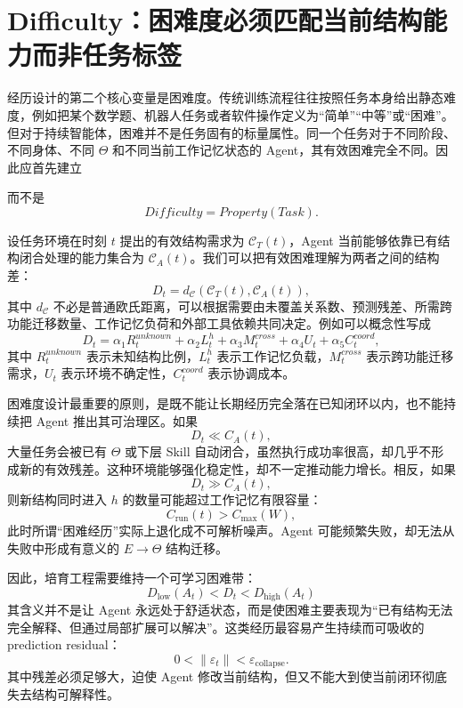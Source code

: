 \section{Difficulty：困难度必须匹配当前结构能力而非任务标签}

经历设计的第二个核心变量是困难度。传统训练流程往往按照任务本身给出静态难度，例如把某个数学题、机器人任务或者软件操作定义为“简单”“中等”或“困难”。但对于持续智能体，困难并不是任务固有的标量属性。同一个任务对于不同阶段、不同身体、不同 $\Theta$ 和不同当前工作记忆状态的 Agent，其有效困难完全不同。因此应首先建立
\begin{statementbox}
\centering
{}
\end{statementbox}
而不是
\[
Difficulty=Property(Task).
\]

设任务环境在时刻 $t$ 提出的有效结构需求为 $\mathcal C_T(t)$，Agent 当前能够依靠已有结构闭合处理的能力集合为 $\mathcal C_A(t)$。我们可以把有效困难理解为两者之间的结构差：
\[
D_t
=
d_{\mathcal C}
\left(
\mathcal C_T(t),
\mathcal C_A(t)
\right),
\]
其中 $d_{\mathcal C}$ 不必是普通欧氏距离，可以根据需要由未覆盖关系数、预测残差、所需跨功能迁移数量、工作记忆负荷和外部工具依赖共同决定。例如可以概念性写成
\[
D_t
=
\alpha_1 R_t^{unknown}
+
\alpha_2 L_t^{h}
+
\alpha_3 M_t^{cross}
+
\alpha_4 U_t
+
\alpha_5 C_t^{coord},
\]
其中 $R_t^{unknown}$ 表示未知结构比例，$L_t^{h}$ 表示工作记忆负载，$M_t^{cross}$ 表示跨功能迁移需求，$U_t$ 表示环境不确定性，$C_t^{coord}$ 表示协调成本。

困难度设计最重要的原则，是既不能让长期经历完全落在已知闭环以内，也不能持续把 Agent 推出其可治理区。如果
\[
D_t\ll C_A(t),
\]
大量任务会被已有 $\Theta$ 或下层 Skill 自动闭合，虽然执行成功率很高，却几乎不形成新的有效残差。这种环境能够强化稳定性，却不一定推动能力增长。相反，如果
\[
D_t\gg C_A(t),
\]
则新结构同时进入 $h$ 的数量可能超过工作记忆有限容量：
\[
C_{\mathrm{run}}(t)
>
C_{\max}(W),
\]
此时所谓“困难经历”实际上退化成不可解析噪声。Agent 可能频繁失败，却无法从失败中形成有意义的 $E\rightarrow\Theta$ 结构迁移。

因此，培育工程需要维持一个可学习困难带：
\[
\boxed{
D_{\mathrm{low}}(A_t)
<
D_t
<
D_{\mathrm{high}}(A_t)
}
\]
其含义并不是让 Agent 永远处于舒适状态，而是使困难主要表现为“已有结构无法完全解释、但通过局部扩展可以解决”。这类经历最容易产生持续而可吸收的 prediction residual：
\[
0
<
\|\varepsilon_t\|
<
\varepsilon_{\mathrm{collapse}}.
\]
其中残差必须足够大，迫使 Agent 修改当前结构，但又不能大到使当前闭环彻底失去结构可解释性。

